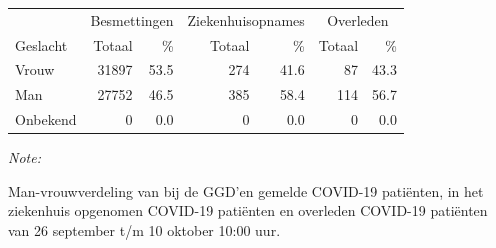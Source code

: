 \documentclass[
  english,
  man,floatsintext]{apa6}
\begin{document}
\begin{table}[H]
\centering\begingroup\fontsize{11}{13}\selectfont

\begin{threeparttable}
\begin{tabular}{lrrrrrr}
\toprule
\multicolumn{1}{c}{ } & \multicolumn{2}{c}{Besmettingen} & \multicolumn{2}{c}{Ziekenhuisopnames} & \multicolumn{2}{c}{Overleden} \\
\cmidrule(l{3pt}r{3pt}){2-3} \cmidrule(l{3pt}r{3pt}){4-5} \cmidrule(l{3pt}r{3pt}){6-7}
Geslacht & Totaal & \% & Totaal & \% & Totaal & \%\\
\midrule
Vrouw & 31897 & 53.5 & 274 & 41.6 & 87 & 43.3\\
Man & 27752 & 46.5 & 385 & 58.4 & 114 & 56.7\\
Onbekend & 0 & 0.0 & 0 & 0.0 & 0 & 0.0\\
\bottomrule
\end{tabular}
\begin{tablenotes}
\item \textit{Note: } 
\item Man-vrouwverdeling van bij de GGD’en gemelde COVID-19 patiënten, in het ziekenhuis opgenomen COVID-19 patiënten en overleden COVID-19 patiënten van 26 september t/m 10 oktober 10:00 uur.
\end{tablenotes}
\end{threeparttable}
\endgroup{}
\end{table}
\newpage
\end{document}
